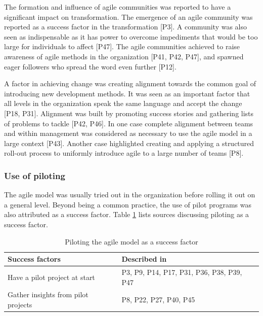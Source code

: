 
The formation and influence of agile communities was reported to have a
significant impact on transformation.
The emergence of an agile community was reported as a success factor in the
transformation [P3]. A community was also seen as indispensable as it has power
to overcome impediments that would be too large for individuals to affect [P47].
The agile communities achieved to raise awareness of agile methods in the
organization [P41, P42, P47], and spawned eager followers who spread the word
even further [P12].


A factor in achieving change was creating alignment towards the common goal of
introducing new development methods. It was seen as an important factor that all
levels in the organization speak the same language and accept the change [P18,
P31]. Alignment was built by promoting success stories and gathering lists of
problems to tackle [P42, P46]. In one case complete alignment between teams and
within management was considered as necessary to use the agile model in a large
context [P43]. Another case highlighted creating and applying a structured
roll-out process to uniformly introduce agile to a large number of teams [P8].


\subsubsection{Use of piloting}

The agile model was usually tried out in the organization before rolling it out
on a general level. Beyond being a common practice, the use of pilot programs
was also attributed as a success factor. Table \ref{table:success_pilots} lists
sources discussing piloting as a success factor.

\begin{table}[h]
    \centering
    \begin{tabular}{ >{\raggedright\arraybackslash}p{}
                     >{\raggedright\arraybackslash}p{} }
        \toprule
        Success factors  &  Described in \\
        \midrule
        Have a pilot project at start  &
                P3, P9, P14, P17, P31, P36, P38, P39, P47  \\
        Gather insights from pilot projects  &
                P8, P22, P27, P40, P45  \\
        \bottomrule
    \end{tabular}
    \caption{Piloting the agile model as a success factor}
    \label{table:success_pilots}
\end{table}


